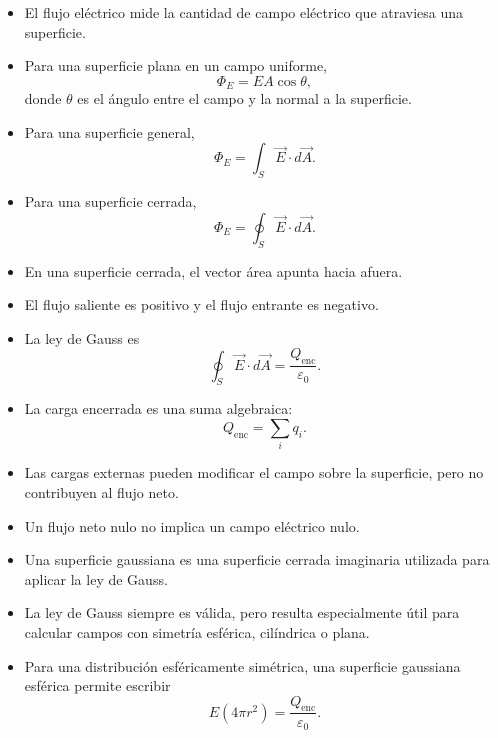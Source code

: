 \begin{resumen}

\begin{itemize}
    \item El flujo eléctrico mide la cantidad de campo eléctrico que atraviesa una
    superficie.

    \item Para una superficie plana en un campo uniforme,
    \[
    \boxed{\Phi_E=EA\cos\theta},
    \]
    donde \(\theta\) es el ángulo entre el campo y la normal a la superficie.

    \item Para una superficie general,
    \[
    \boxed{\Phi_E=\int_S\vec E\cdot d\vec A}.
    \]

    \item Para una superficie cerrada,
    \[
    \boxed{\Phi_E=\oint_S\vec E\cdot d\vec A}.
    \]

    \item En una superficie cerrada, el vector área apunta hacia afuera.

    \item El flujo saliente es positivo y el flujo entrante es negativo.

    \item La ley de Gauss es
    \[
    \boxed{
    \oint_S\vec E\cdot d\vec A
    =
    \frac{Q_{\text{enc}}}{\varepsilon_0}
    }.
    \]

    \item La carga encerrada es una suma algebraica:
    \[
    \boxed{Q_{\text{enc}}=\sum_iq_i}.
    \]

    \item Las cargas externas pueden modificar el campo sobre la superficie, pero no
    contribuyen al flujo neto.

    \item Un flujo neto nulo no implica un campo eléctrico nulo.

    \item Una superficie gaussiana es una superficie cerrada imaginaria utilizada para
    aplicar la ley de Gauss.

    \item La ley de Gauss siempre es válida, pero resulta especialmente útil para calcular
    campos con simetría esférica, cilíndrica o plana.

    \item Para una distribución esféricamente simétrica, una superficie gaussiana esférica
    permite escribir
    \[
    \boxed{
    E(4\pi r^2)=\frac{Q_{\text{enc}}}{\varepsilon_0}
    }.
    \]


\end{itemize}
\end{resumen}
